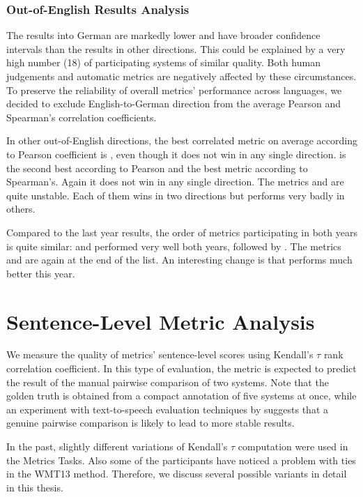 \subsubsection{Out-of-English Results Analysis}

The results into German are markedly lower and have broader confidence
intervals than the results in other directions. This could be explained by a
very
high number (18) of participating systems of similar quality. 
Both human judgements and automatic metrics are negatively affected by these
circumstances. To preserve the reliability of overall metrics' performance
across languages, we
decided to exclude English-to-German
direction from the average Pearson and Spearman's correlation coefficients.

In other out-of-English directions, the best correlated metric on average according
to Pearson coefficient is , even though it does not win in any
single direction.  is the second best according to Pearson
and the best metric according to Spearman's. Again it does not win in any
single direction. The metrics  and  are quite
unstable.  Each of them wins in two directions but performs very badly in
others.

Compared to the last year results, the order of metrics participating in both
years is quite similar:  and  performed very well
both years, followed by . The metrics  and 
are again at the end of the list. An interesting change is that
 performs much better this year.



\section{Sentence-Level Metric Analysis}
\label{segment-level}

We measure the quality of metrics' sentence-level scores using Kendall's $\tau$
rank correlation coefficient. In this type of evaluation, the metric is expected
to predict the result of the manual pairwise comparison of two systems. Note
that the golden truth is obtained from a compact annotation of five systems at
once, while an experiment with text-to-speech evaluation techniques by
 suggests that a genuine pairwise
comparison is likely to lead to more stable results.

In the past, slightly different variations of
Kendall's $\tau$ computation were used in the Metrics Tasks. Also some of the
participants have noticed a problem with ties in the WMT13 method. Therefore, we
discuss several possible variants in detail in this thesis.


